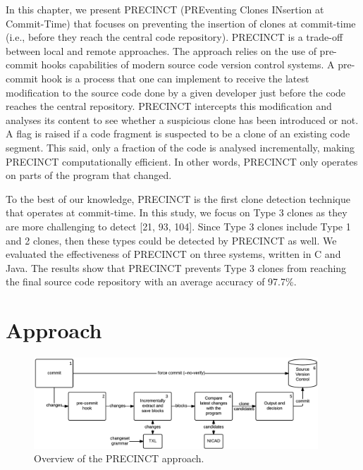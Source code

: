 \documentclass[12pt]{report}
\begin{document}
In this chapter, we present PRECINCT (PREventing Clones INsertion at
Commit-Time) that focuses on preventing the insertion of clones at
commit-time (i.e., before they reach the central code repository).
PRECINCT is a trade-off between local and remote approaches. The
approach relies on the use of pre-commit hooks capabilities of modern
source code version control systems. A pre-commit hook is a process that
one can implement to receive the latest modification to the source code
done by a given developer just before the code reaches the central
repository. PRECINCT intercepts this modification and analyses its
content to see whether a suspicious clone has been introduced or not. A
flag is raised if a code fragment is suspected to be a clone of an
existing code segment. This said, only a fraction of the code is
analysed incrementally, making PRECINCT computationally efficient. In
other words, PRECINCT only operates on parts of the program that
changed.

To the best of our knowledge, PRECINCT is the first clone detection
technique that operates at commit-time. In this study, we focus on Type
3 clones as they are more challenging to detect {[}21, 93, 104{]}. Since
Type 3 clones include Type 1 and 2 clones, then these types could be
detected by PRECINCT as well. We evaluated the effectiveness of PRECINCT
on three systems, written in C and Java. The results show that PRECINCT
prevents Type 3 clones from reaching the final source code repository
with an average accuracy of 97.7\%.

\section{Approach}\label{approach-1}

\begin{figure}
  \centering
  \includegraphics[width=0.95\textwidth]{media/chap5/approach.png}
  \caption{Overview of the PRECINCT approach.}
\end{figure}
\end{document}
